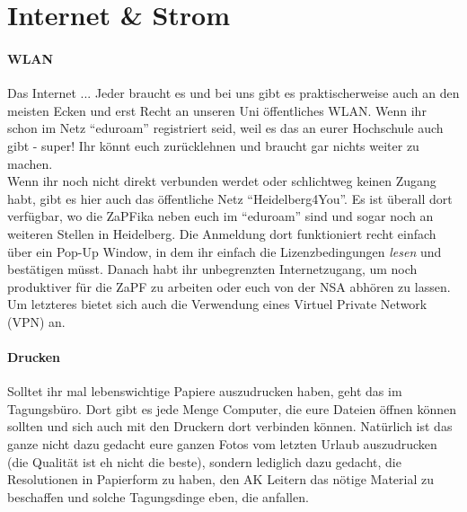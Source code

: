 \section{Internet \& Strom}
  \paragraph{WLAN}
  Das Internet ... Jeder braucht es und bei uns gibt es praktischerweise auch an den meisten Ecken und erst Recht an unseren Uni
  öffentliches WLAN. Wenn ihr schon im Netz ``eduroam'' registriert seid, weil es das an eurer Hochschule auch gibt - super!
  Ihr könnt euch zurücklehnen und braucht gar nichts weiter zu machen. \\
  Wenn ihr noch nicht direkt verbunden werdet oder schlichtweg keinen Zugang habt, gibt es hier auch das öffentliche Netz ``Heidelberg4You''.
  Es ist überall dort verfügbar, wo die ZaPFika neben euch im ``eduroam'' sind und sogar noch an weiteren Stellen in Heidelberg.
  Die Anmeldung dort funktioniert recht einfach über ein Pop-Up Window, in dem ihr einfach die Lizenzbedingungen \textit{lesen} und bestätigen müsst.
  Danach habt ihr unbegrenzten Internetzugang, um noch produktiver für die ZaPF zu arbeiten oder euch von der NSA abhören zu lassen.
  Um letzteres bietet sich auch die Verwendung eines Virtuel Private Network (VPN) an. \\

  \paragraph{Drucken}
  Solltet ihr mal lebenswichtige Papiere auszudrucken haben, geht das im Tagungsbüro. Dort gibt es jede Menge Computer, die eure Dateien
  öffnen können sollten und sich auch mit den Druckern dort verbinden können.
  Natürlich ist das ganze nicht dazu gedacht eure ganzen Fotos vom letzten Urlaub auszudrucken (die Qualität ist eh nicht die beste),
  sondern lediglich dazu gedacht, die Resolutionen in Papierform zu haben, den AK Leitern das nötige Material zu beschaffen und solche
  Tagungsdinge eben, die anfallen.

